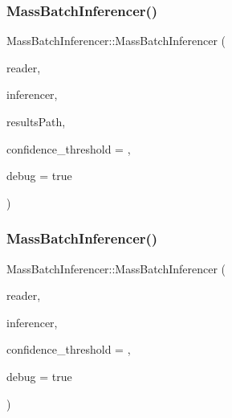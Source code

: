 \subsubsection{\texorpdfstring{Mass\+Batch\+Inferencer()}{MassBatchInferencer()}\hspace{0.1cm}{\footnotesize\ttfamily [1/2]}}
{\footnotesize\ttfamily Mass\+Batch\+Inferencer\+::\+Mass\+Batch\+Inferencer (\begin{DoxyParamCaption}\item[{\hyperlink{_dataset_reader_8h_a30d89cba514a220d64d04535c0465f1c}{Dataset\+Reader\+Ptr}}]{reader,  }\item[{\hyperlink{_framework_inferencer_8h_a7b59ebc4b080d1be0d1a6240703011f2}{Framework\+Inferencer\+Ptr}}]{inferencer,  }\item[{const std\+::string \&}]{results\+Path,  }\item[{double}]{confidence\+\_\+threshold = {},  }\item[{bool}]{debug = {\ttfamily true} }\end{DoxyParamCaption})}

\mbox{\label{class_mass_batch_inferencer_a62dc237856fd2a295e9308450f9b8218}} 
\subsubsection{\texorpdfstring{Mass\+Batch\+Inferencer()}{MassBatchInferencer()}\hspace{0.1cm}{\footnotesize\ttfamily [2/2]}}
{\footnotesize\ttfamily Mass\+Batch\+Inferencer\+::\+Mass\+Batch\+Inferencer (\begin{DoxyParamCaption}\item[{\hyperlink{_dataset_reader_8h_a30d89cba514a220d64d04535c0465f1c}{Dataset\+Reader\+Ptr}}]{reader,  }\item[{\hyperlink{_framework_inferencer_8h_a7b59ebc4b080d1be0d1a6240703011f2}{Framework\+Inferencer\+Ptr}}]{inferencer,  }\item[{double}]{confidence\+\_\+threshold = {},  }\item[{bool}]{debug = {\ttfamily true} }\end{DoxyParamCaption})}




